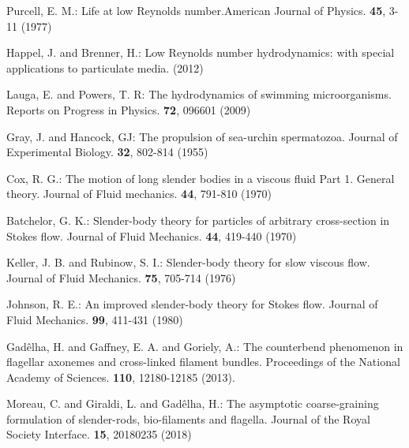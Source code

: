 \documentclass[graybox]{svmult}
\begin{document}


\begin{thebibliography}{99.}

Purcell, E. M.: Life at low Reynolds number.American Journal of Physics. \textbf{45}, 3-11 (1977)


Happel, J. and Brenner, H.: Low Reynolds number hydrodynamics: with special applications to particulate media. (2012)

Lauga, E. and Powers, T. R: The hydrodynamics of swimming microorganisms. Reports on Progress in Physics. \textbf{72}, 096601 (2009) 


Gray, J. and Hancock, GJ: The propulsion of sea-urchin spermatozoa. Journal of Experimental Biology. \textbf{32}, 802-814 (1955)

Cox, R. G.: The motion of long slender bodies in a viscous fluid Part 1. General theory. Journal of Fluid mechanics. \textbf{44}, 791-810 (1970)

Batchelor, G. K.: Slender-body theory for particles of arbitrary cross-section in Stokes flow. Journal of Fluid Mechanics. \textbf{44}, 419-440 (1970)

Keller, J. B. and Rubinow, S. I.: Slender-body theory for slow viscous flow. Journal of Fluid Mechanics. \textbf{75}, 705-714 (1976)

Johnson, R. E.: An improved slender-body theory for Stokes flow. Journal of Fluid Mechanics. \textbf{99}, 411-431 (1980)


Gadêlha, H. and Gaffney, E. A. and Goriely, A.: The counterbend phenomenon in flagellar axonemes and cross-linked filament bundles. Proceedings of the National Academy of Sciences. \textbf{110}, 12180-12185 (2013).

Moreau, C. and Giraldi, L. and Gadêlha, H.: 
The asymptotic coarse-graining formulation of slender-rods, bio-filaments and flagella. Journal of the Royal Society Interface. \textbf{15}, 20180235 (2018)


\end{thebibliography}
\end{document}
